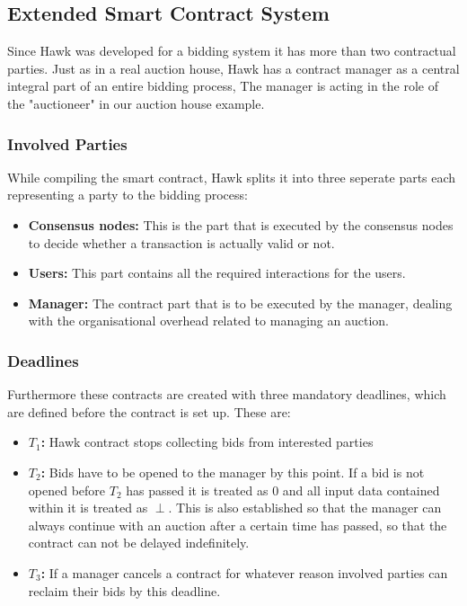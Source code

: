 \subsection{Extended Smart Contract System}
Since Hawk was developed for a bidding system it has more than two contractual parties. Just as in a real auction house, Hawk has a contract manager as a central integral part of an entire bidding process, The manager is acting in the role of the "auctioneer" in our auction house example. 

\subsubsection{Involved Parties}
While compiling the smart contract, Hawk splits it into three seperate parts each representing a party to the bidding process:
\begin{itemize}
\item \textbf{Consensus nodes:}
This is the part that is executed by the consensus nodes to decide whether a transaction is actually valid or not.
\item \textbf{Users:}
This part contains all the required interactions for the users.
\item \textbf{Manager:}
The contract part that is to be executed by the manager, dealing with the organisational overhead related to managing an auction.
\end{itemize}

\subsubsection{Deadlines}
Furthermore these contracts are created with three mandatory deadlines, which are defined before the contract is set up. These are:
\begin{itemize}
\item \textbf{$T_1$:} Hawk contract stops collecting bids from interested parties
\item \textbf{$T_2$:} Bids have to be opened to the manager by this point. If a bid is not opened before $T_2$ has passed it is treated as 0 and all input data contained within it is treated as $\perp$. This is also established so that the manager can always continue with an auction after a certain time has passed, so that the contract can not be delayed indefinitely.
\item \textbf{$T_3$:} If a manager cancels a contract for whatever reason involved parties can reclaim their bids by this deadline.
\end{itemize}

